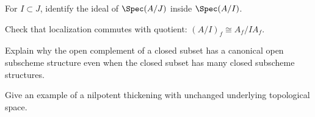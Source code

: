 \begin{exercise}\label{exr:vi22-23}
For $I\subset J$, identify the ideal of $\Spec(A/J)$ inside $\Spec(A/I)$.
\end{exercise}

\begin{exercise}\label{exr:vi22-24}
Check that localization commutes with quotient: $(A/I)_f\cong A_f/IA_f$.
\end{exercise}

\begin{exercise}\label{exr:vi22-25}
Explain why the open complement of a closed subset has a canonical open subscheme structure even when the closed subset has many closed subscheme structures.
\end{exercise}

\begin{exercise}\label{exr:vi22-26}
Give an example of a nilpotent thickening with unchanged underlying topological space.
\end{exercise}
